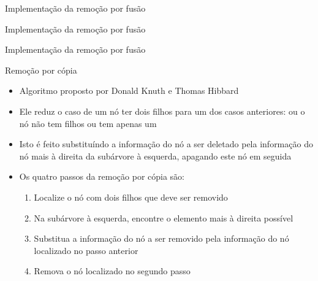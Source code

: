 \begin{frame}[fragile]{Implementação da remoção por fusão}
\end{frame}

\begin{frame}[fragile]{Implementação da remoção por fusão}
\end{frame}

\begin{frame}[fragile]{Implementação da remoção por fusão}
\end{frame}

\begin{frame}[fragile]{Remoção por cópia}

	\begin{itemize}
		\item Algoritmo proposto por Donald Knuth e Thomas Hibbard

		\item Ele reduz o caso de um nó ter dois filhos para um dos casos anteriores: ou 
            o nó não tem filhos ou tem apenas um

		\item Isto é feito substituíndo a informação do nó a ser deletado pela informação do nó 
                mais à direita da subárvore à esquerda, apagando este nó em seguida

        \item Os quatro passos da remoção por cópia são:
        \begin{enumerate}
            \item Localize o nó com dois filhos que deve ser removido

            \item Na subárvore à esquerda, encontre o elemento mais à direita possível

            \item Substitua a informação do nó a ser removido pela informação do nó localizado 
                no passo anterior

            \item Remova o nó localizado no segundo passo
        \end{enumerate}
    \end{itemize}
\end{frame}  

